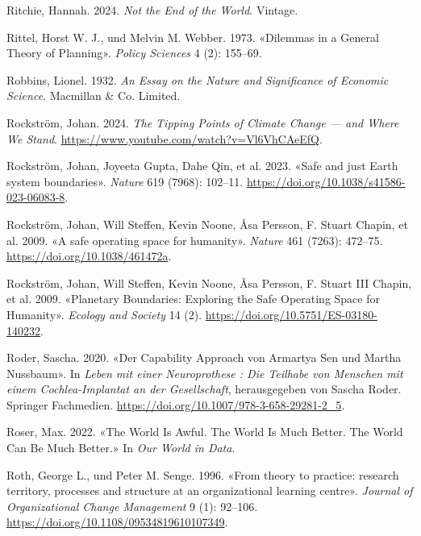 \documentclass[
  nswissgerman,
  a4paper,
  DIV=11,
  numbers=noendperiod,
  oneside,
  openany]{scrreprt}
\newlength{\cslhangindent}
\newenvironment{CSLReferences}[2] %
 {\begin{list}{}{%
  \setlength{\itemindent}{0pt}
  \setlength{\leftmargin}{0pt}
  \setlength{\parsep}{0pt}
  \ifodd #1
   \setlength{\leftmargin}{\cslhangindent}
   \setlength{\itemindent}{-1\cslhangindent}
  \fi
  \setlength{\itemsep}{#2\baselineskip}}}
 {\end{list}}
\begin{document}
\begin{CSLReferences}{1}{1}
Ritchie, Hannah. 2024. \emph{Not the {End} of the {World}}. Vintage.

Rittel, Horst W. J., und Melvin M. Webber. 1973. {«Dilemmas in a
{General Theory} of {Planning}»}. \emph{Policy Sciences} 4 (2): 155--69.

Robbins, Lionel. 1932. \emph{An {Essay} on the {Nature} and
{Significance} of {Economic Science}}. Macmillan \& Co. Limited.

Rockström, Johan. 2024. \emph{The {Tipping} {Points} of {Climate}
{Change} --- and {Where} {We} {Stand}}.
\url{https://www.youtube.com/watch?v=Vl6VhCAeEfQ}.

Rockström, Johan, Joyeeta Gupta, Dahe Qin, et al. 2023. {«Safe and just
{Earth} system boundaries»}. \emph{Nature} 619 (7968): 102--11.
\url{https://doi.org/10.1038/s41586-023-06083-8}.

Rockström, Johan, Will Steffen, Kevin Noone, Åsa Persson, F. Stuart
Chapin, et al. 2009. {«A safe operating space for humanity»}.
\emph{Nature} 461 (7263): 472--75.
\url{https://doi.org/10.1038/461472a}.

{Rockström, Johan, Will Steffen, Kevin Noone, Åsa Persson, F. Stuart III
Chapin, et al.} 2009. {«Planetary {Boundaries}: {Exploring} the {Safe
Operating Space} for {Humanity}»}. \emph{Ecology and Society} 14 (2).
\url{https://doi.org/10.5751/ES-03180-140232}.

Roder, Sascha. 2020. {«{Der Capability Approach von Armartya Sen und
Martha Nussbaum}»}. In \emph{{Leben mit einer Neuroprothese : Die
Teilhabe von Menschen mit einem Cochlea-Implantat an der Gesellschaft}},
herausgegeben von Sascha Roder. Springer Fachmedien.
\url{https://doi.org/10.1007/978-3-658-29281-2_5}.

Roser, Max. 2022. {«The World Is Awful. {The} World Is Much Better.
{The} World Can Be Much Better.»} In \emph{Our World in Data}.

Roth, George L., und Peter M. Senge. 1996. {«From theory to practice:
research territory, processes and structure at an organizational
learning centre»}. \emph{Journal of Organizational Change Management} 9
(1): 92--106. \url{https://doi.org/10.1108/09534819610107349}.


\end{CSLReferences}
\end{document}
